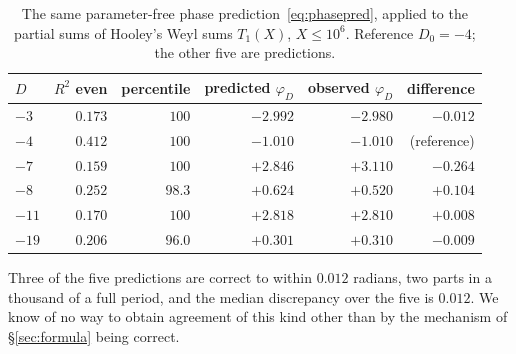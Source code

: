 \documentclass[11pt,a4paper]{article}
\theoremstyle{remark}\newtheorem{remark}[theorem]{Remark}
\begin{document}
\begin{table}[htbp]
\centering\small
\caption{The same parameter-free phase prediction~\eqref{eq:phasepred}, applied to the partial sums of Hooley's Weyl
sums $T_1(X)$, $X\le10^6$. Reference $D_0=-4$; the other five are predictions.}\label{tab:weylphase}
\begin{tabular}{lrrrrr}
\toprule
$D$ & $R^2$ even & percentile & predicted $\varphi_D$ & observed $\varphi_D$ & difference\\
\midrule
$-3$  & $0.173$ & $100$  & $-2.992$ & $-2.980$ & $-0.012$\\
$-4$  & $0.412$ & $100$  & $-1.010$ & $-1.010$ & (reference)\\
$-7$  & $0.159$ & $100$  & $+2.846$ & $+3.110$ & $-0.264$\\
$-8$  & $0.252$ & $98.3$ & $+0.624$ & $+0.520$ & $+0.104$\\
$-11$ & $0.170$ & $100$  & $+2.818$ & $+2.810$ & $+0.008$\\
$-19$ & $0.206$ & $96.0$ & $+0.301$ & $+0.310$ & $-0.009$\\
\bottomrule
\end{tabular}
\end{table}

Three of the five predictions are correct to within $0.012$ radians, two parts in a thousand of a full period, and
the median discrepancy over the five is $0.012$. We know of no way to obtain agreement of this kind other than by the
mechanism of \S\ref{sec:formula} being correct.
\end{document}

